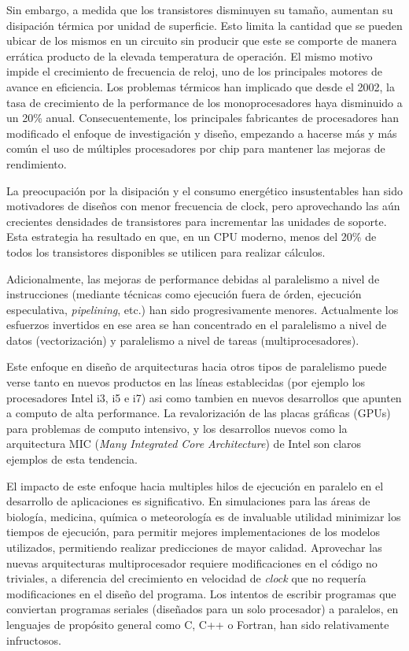 Sin embargo, a medida que los transistores disminuyen su tama\~no, aumentan su
disipaci\'on t\'ermica por unidad de superficie.  Esto limita la cantidad que se pueden ubicar de los mismos
en un circuito sin producir que este se comporte de manera err\'atica producto
de la elevada temperatura de operaci\'on. El mismo motivo impide el crecimiento de frecuencia de reloj, uno de los
principales motores de avance en eficiencia. Los problemas t\'ermicos han implicado que
desde el 2002, la tasa de crecimiento de la performance de los monoprocesadores haya disminuido a un 20\% anual.
Consecuentemente, los principales fabricantes de procesadores han modificado el enfoque de investigaci\'on y dise\~no, empezando
a hacerse m\'as y m\'as com\'un el uso de m\'ultiples procesadores por chip para mantener las mejoras de rendimiento.

La preocupaci\'on por la disipaci\'on y el consumo energ\'etico insustentables han sido motivadores
de dise\~nos con menor frecuencia de clock, pero aprovechando las a\'un crecientes densidades de
transistores para incrementar las unidades de soporte. Esta estrategia ha resultado en que, en un
CPU moderno, menos del 20\% de todos los transistores disponibles se utilicen para realizar c\'alculos.

Adicionalmente, las mejoras de performance debidas al paralelismo
a nivel de instrucciones (mediante t\'ecnicas como ejecuci\'on fuera de \'orden,
ejecuci\'on especulativa, \textit{pipelining}, etc.) han sido
progresivamente menores. Actualmente los esfuerzos invertidos en ese area se han concentrado en
el paralelismo a nivel de datos (vectorizaci\'on) y paralelismo a nivel de tareas (multiprocesadores).~\cite{HennessyPatterson}

Este enfoque en dise\~no de arquitecturas hacia otros tipos de paralelismo puede verse tanto
en nuevos productos en las l\'ineas establecidas (por ejemplo los procesadores Intel i3, i5 e i7)
asi como tambien en nuevos desarrollos que apunten a computo de alta performance.
La revalorizaci\'on de las placas gr\'aficas (GPUs) para problemas de computo intensivo, y los desarrollos
nuevos como la arquitectura MIC (\textit{Many Integrated Core Architecture}) de Intel son
claros ejemplos de esta tendencia.

El impacto de este enfoque hacia multiples hilos de ejecuci\'on en paralelo en el
desarrollo de aplicaciones es significativo. En simulaciones para las \'areas de biolog\'ia,
medicina, qu\'imica o meteorolog\'ia es de invaluable utilidad minimizar los tiempos
de ejecuci\'on, para permitir mejores implementaciones de los modelos utilizados,
permitiendo realizar predicciones de mayor calidad. Aprovechar las nuevas
arquitecturas multiprocesador requiere modificaciones en el c\'odigo no triviales,
a diferencia del crecimiento en velocidad de \textit{clock} que no requer\'ia modificaciones
en el dise\~no del programa. Los intentos de escribir programas que conviertan
programas seriales (dise\~nados para un solo procesador) a paralelos, en lenguajes
de prop\'osito general como C, C++ o Fortran, han sido relativamente infructosos.

